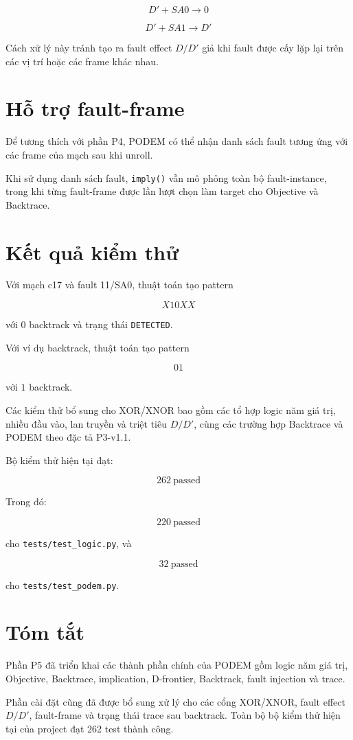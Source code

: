 \[
D' + SA0 \rightarrow 0
\]

\[
D' + SA1 \rightarrow D'
\]

Cách xử lý này tránh tạo ra fault effect $D/D'$ giả khi fault được cấy lặp
lại trên các vị trí hoặc các frame khác nhau.

\section{Hỗ trợ fault-frame}

Để tương thích với phần P4, PODEM có thể nhận danh sách fault tương ứng với
các frame của mạch sau khi unroll.

Khi sử dụng danh sách fault, \texttt{imply()} vẫn mô phỏng toàn bộ
fault-instance, trong khi từng fault-frame được lần lượt chọn làm target
cho Objective và Backtrace.

\section{Kết quả kiểm thử}

Với mạch c17 và fault 11/SA0, thuật toán tạo pattern

\[
X10XX
\]

với $0$ backtrack và trạng thái \texttt{DETECTED}.

Với ví dụ backtrack, thuật toán tạo pattern

\[
01
\]

với $1$ backtrack.

Các kiểm thử bổ sung cho XOR/XNOR bao gồm các tổ hợp logic năm giá trị,
nhiều đầu vào, lan truyền và triệt tiêu $D/D'$, cùng các trường hợp
Backtrace và PODEM theo đặc tả P3-v1.1.

Bộ kiểm thử hiện tại đạt:

\[
\boxed{262\ \text{passed}}
\]

Trong đó:

\[
\boxed{220\ \text{passed}}
\]

cho \texttt{tests/test\_logic.py}, và

\[
\boxed{32\ \text{passed}}
\]

cho \texttt{tests/test\_podem.py}.

\section{Tóm tắt}

Phần P5 đã triển khai các thành phần chính của PODEM gồm logic năm giá trị,
Objective, Backtrace, implication, D-frontier, Backtrack, fault injection
và trace.

Phần cài đặt cũng đã được bổ sung xử lý cho các cổng XOR/XNOR, fault effect
$D/D'$, fault-frame và trạng thái trace sau backtrack. Toàn bộ bộ kiểm thử
hiện tại của project đạt 262 test thành công.